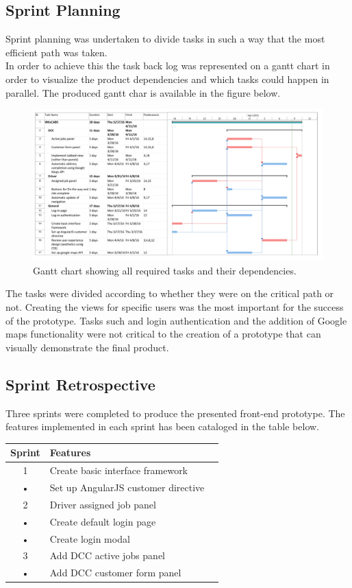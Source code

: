 \documentclass[12pt]{article}
\begin{document}
\subsection{Sprint Planning}
Sprint planning was undertaken to divide tasks in such a way that the most efficient path was taken.\\

In order to achieve this the task back log was represented on a gantt chart in order to visualize the product dependencies and which tasks could happen in parallel. The produced gantt char is available in the figure below.\\

\begin{figure}[ht]
\centering
\includegraphics[width=1\textwidth]{gantt.png}
\caption{Gantt chart showing all required tasks and their dependencies.}
\end{figure}
The tasks were divided according to whether they were on the critical path or not. Creating the views for specific users was the most important for the success of the prototype. Tasks such and login authentication and the addition of Google maps functionality were not critical to the creation of a prototype that can visually demonstrate the final product.
\subsection{Sprint Retrospective}
Three sprints were completed to produce the presented front-end prototype. The features implemented in each sprint has been cataloged in the table below.\\

\begin{tabular}{|c|l|c|}
\hline 
Sprint & Features\\ 
\hline 
 1 & Create basic interface framework\\ 
• & Set up AngularJS customer directive\\

\hline 
 2 & Driver assigned job panel\\
• & Create default login page\\
• & Create login modal\\
\hline 
 3 & Add DCC active jobs panel \\ 
 • & Add DCC customer form panel\\
 

\hline
\end{tabular} 
\end{document}
